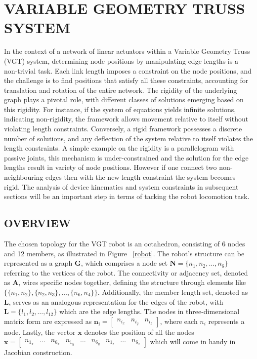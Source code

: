 \documentclass{IEEEtaes}
\begin{document}
\vfill


\section{VARIABLE GEOMETRY TRUSS SYSTEM}

\begin{figure}[t!]
    \centering
    \vspace{0.5em}
\end{figure}
In the context of a network of linear actuators within a Variable Geometry Truss (VGT) system, determining node positions by manipulating edge lengths is a non-trivial task. Each link length imposes a constraint on the node positions, and the challenge is to find positions that satisfy all these constraints, accounting for translation and rotation of the entire network. The rigidity of the underlying graph plays a pivotal role, with different classes of solutions emerging based on this rigidity. For instance, if the system of equations yields infinite solutions, indicating non-rigidity, the framework allows movement relative to itself without violating length constraints. Conversely, a rigid framework possesses a discrete number of solutions, and any deflection of the system relative to itself violates the length constraints. A simple example on the rigidity is a parallelogram with passive joints, this mechanism is under-constrained and the solution for the edge lengths result in variety of node positions. However if one connect two non-neighbouring edges then with the new length constraint the system becomes rigid. The analysis of device kinematics and system constraints in subsequent sections will be an important step in terms of tacking the robot locomotion task.

\subsection{\small{\fontsize{10}{10}\selectfont O}VERVIEW}

The chosen topology for the VGT robot is an octahedron, consisting of 6 nodes and 12 members, as illustrated in Figure ~\ref{robot}. The robot's structure can be represented as a graph $\mathbf{G}$, which comprises a node set $\mathbf{N} = \{n_1, n_2, \dots, n_6\}$ referring to the vertices of the robot. The connectivity or adjacency set, denoted as $\mathbf{A}$, wires specific nodes together, defining the structure through elements like $\{\{n_1, n_2\}, \{n_2, n_3\}, \dots, \{n_6, n_4\}\}$. Additionally, the member length set, denoted as $\mathbf{L}$, serves as an analogous representation for the edges of the robot, with $\mathbf{L} = \{l_1, l_2, \dots, l_{12}\}$ which are the edge lengths. The nodes in three-dimensional matrix form are expressed as $\mathbf{n_i} = \begin{bmatrix} n_{i_x} & n_{i_y} & n_{i_z} \end{bmatrix}$, where each $n_i$ represents a node. Lastly, the vector $\mathbf{x}$ denotes the position of all the nodes $\mathbf{x}=\begin{bmatrix} n_{1_x}& \dots & n_{6_x} & n_{1_y} & \dots & n_{6_y} & n_{1_z} & \dots & n_{6_z} \end{bmatrix}$ which will come in handy in Jacobian construction.
\end{document}
